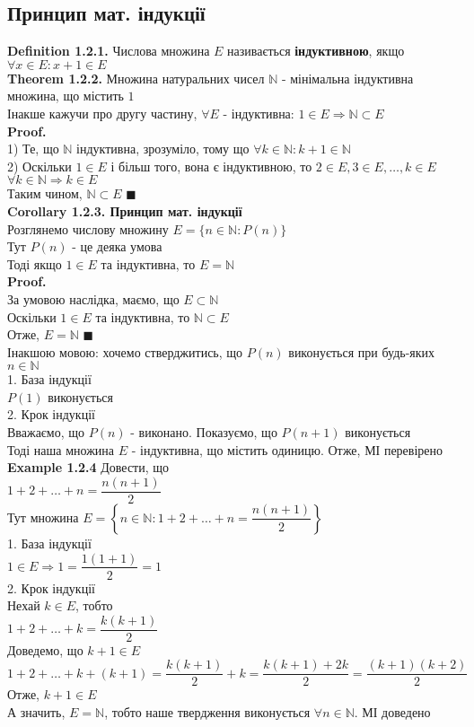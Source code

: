 \documentclass[a4paper, 14pt]{extarticle}
\def\bigline{\vspace{5mm}\\}
\def\defin#1{\textbf{Definition {#1}}}
\def\ex#1{\textbf{Example {#1}}}
\def\th#1{\textbf{Theorem {#1}}}
\def\crl#1{\textbf{Corollary {#1}}}
\def\proof{\textbf{Proof.}\\}
\def\bigline{\vspace{5mm}\\}
\def\qed{$\blacksquare$}
\begin{document}
\subsection{Принцип мат. індукції}
	\defin{1.2.1.} Числова множина $E$ називається \textbf{індуктивною}, якщо $\forall x \in E: x+1 \in E$
	\bigline
	\th{1.2.2.} Множина натуральних чисел $\mathbb{N}$ - мінімальна індуктивна множина, що містить $1$\\
	Інакше кажучи про другу частину, $\forall E$ - індуктивна: $1 \in E \Rightarrow \mathbb{N} \subset E$\\
	\proof
	1) Те, що $\mathbb{N}$ індуктивна, зрозуміло, тому що $\forall k \in \mathbb{N}: k+1 \in \mathbb{N}$\\
	2) Оскільки $1 \in E$ і більш того, вона є індуктивною, то $2 \in E, 3 \in E, \dots, k \in E$\\
	$\forall k \in \mathbb{N} \Rightarrow k \in E$\\
	Таким чином, $\mathbb{N} \subset E$ \qed
	\bigline
	\crl{1.2.3. Принцип мат. індукції}\\
	Розглянемо числову множину $E = \{n \in \mathbb{N}: P(n)\}$\\
	Тут $P(n)$ - це деяка умова\\
	Тоді якщо $1 \in E$ та індуктивна, то $E = \mathbb{N}$\\
	\proof
	За умовою наслідка, маємо, що $E \subset \mathbb{N}$\\
	Оскільки $1 \in E$ та індуктивна, то $\mathbb{N} \subset E$\\
	Отже, $E = \mathbb{N}$ \qed
	\bigline
	Інакшою мовою: хочемо стверджитись, що $P(n)$ виконується при будь-яких $n \in \mathbb{N}$\\
	1. База індукції\\
	$P(1)$ виконується
	\\
	2. Крок індукції\\
	Вважаємо, що $P(n)$ - виконано. Показуємо, що $P(n+1)$ виконується\\
	Тоді наша множина $E$ - індуктивна, що містить одиницю. Отже, МІ перевірено
	\bigline
	\ex{1.2.4} Довести, що\\
	$1 + 2 + \dots + n = \dfrac{n(n+1)}{2}$\\
	Тут множина $E = \left\{n \in \mathbb{N}: 1 + 2 + \dots + n = \dfrac{n(n+1)}{2} \right\}$\\
	1. База індукції\\
	$1 \in E \Rightarrow 1 = \dfrac{1(1+1)}{2} = 1$
	\bigline
	2. Крок індукції\\
	Нехай $k \in E$, тобто\\
	$1 + 2 + \dots + k = \dfrac{k(k+1)}{2}$\\
	Доведемо, що $k+1 \in E$\\
	$1+ 2 + \dots + k + (k+1) = \dfrac{k(k+1)}{2} + k = \dfrac{k(k+1)+2k}{2} = \dfrac{(k+1)(k+2)}{2}$\\
	Отже, $k+1 \in E$\\
	А значить, $E = \mathbb{N}$, тобто наше твердження виконується $\forall n \in \mathbb{N}$. МІ доведено\\
	
\end{document}
